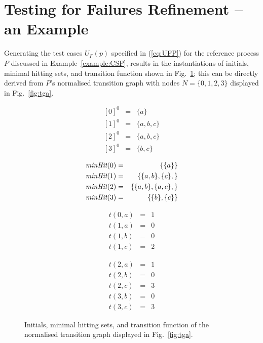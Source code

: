 \section{Testing for Failures Refinement -- an Example}
\label{sec:case}

Generating the test cases $U_F(p)$ specified in  (\ref{eq:UFP}) for the reference
process $P$ discussed in Example~\ref{example:CSP},
results in the   instantiations of initials, minimal hitting sets, and
transition function shown in Fig.~\ref{fig:initialsminhitstrans};
this can be directly derived from $P$'s normalised
transition graph with nodes $N =\{0,1,2,3\}$ displayed in Fig.~\ref{fig:tga}.


\begin{figure}[htbp]
\begin{center}
\begin{minipage}{0.2\textwidth}
	 \begin{eqnarray*}
{ }[0]^0 & = & \{ a \} \\
{ }[1]^0 & = & \{ a,b,c \} \\
{ }[2]^0 & = & \{ a,b,c \} \\
{ }[3]^0 & = & \{ b,c \}
\end{eqnarray*}
	\end{minipage}
	\hfill
	\begin{minipage}{0.33\textwidth}
	 \begin{eqnarray*}
\text{\it minHit}(0) & = & \{ \{ a\} \} \\
\text{\it minHit}(1) & = & \{ \{a,b\}, \{c\}, \} \\
\text{\it minHit}(2) & = & \{  \{a,b\},  \{a,c\},\} \\
\text{\it minHit}(3) & = & \{ \{ b\}, \{c\} \}
\end{eqnarray*}

	\end{minipage}
	\hfill
	\begin{minipage}{0.2\textwidth}
	 \begin{eqnarray*}
t(0,a) & = & 1 \\
t(1,a) & = & 0 \\
t(1,b) & = & 0 \\
t(1,c) & = & 2
\end{eqnarray*}
	\end{minipage}
		\hfill
	\begin{minipage}{0.2\textwidth}
	 \begin{eqnarray*}
t(2,a) & = & 1 \\
t(2,b) & = & 0 \\
t(2,c) & = & 3 \\
t(3,b) & = & 0 \\
t(3,c) &  =& 3
\end{eqnarray*}
	\end{minipage}
	
	
	
	
\caption{Initials, minimal hitting sets, and transition function of the normalised transition graph displayed in Fig.~\ref{fig:tga}.}
\label{fig:initialsminhitstrans}
\end{center}
\end{figure}
